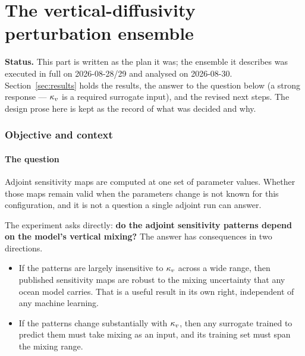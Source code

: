 \part{The vertical-diffusivity perturbation ensemble}

\begin{callout}
\textbf{Status.} This part is written as the plan it was; the ensemble it
describes was executed in full on 2026-08-28/29 and analysed on 2026-08-30.
Section~\ref{sec:results} holds the results, the answer to the question below
(a strong response --- $\kappa_{v}$ is a required surrogate input), and the revised
next steps. The design prose here is kept as the record of what was decided
and why.
\end{callout}

\section{Objective and context}
\label{sec:objective}

\subsection{The question}

Adjoint sensitivity maps are computed at one set of parameter values. Whether
those maps remain valid when the parameters change is not known for this
configuration, and it is not a question a single adjoint run can answer.

The experiment asks directly: \textbf{do the adjoint sensitivity patterns depend
on the model's vertical mixing?} The answer has consequences in two directions.

\begin{itemize}[nosep]
  \item If the patterns are largely insensitive to $\kappa_{v}$ across a wide range,
        then published sensitivity maps are robust to the mixing uncertainty that
        any ocean model carries. That is a useful result in its own right,
        independent of any machine learning.
  \item If the patterns change substantially with $\kappa_{v}$, then any surrogate
        trained to predict them must take mixing as an input, and its training
        set must span the mixing range.
\end{itemize}

